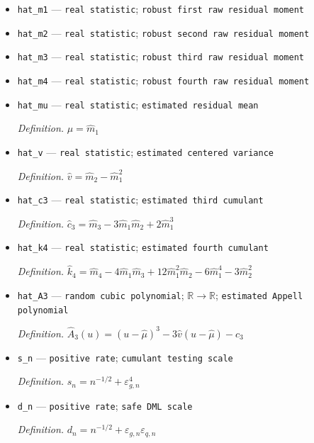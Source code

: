 \documentclass{article}
\begin{document}
\begin{itemize}
  \item \texttt{hat\_\allowbreak{}m1} --- \texttt{real statistic}; \texttt{robust first raw residual moment}
  \item \texttt{hat\_\allowbreak{}m2} --- \texttt{real statistic}; \texttt{robust second raw residual moment}
  \item \texttt{hat\_\allowbreak{}m3} --- \texttt{real statistic}; \texttt{robust third raw residual moment}
  \item \texttt{hat\_\allowbreak{}m4} --- \texttt{real statistic}; \texttt{robust fourth raw residual moment}
  \item \texttt{hat\_\allowbreak{}mu} --- \texttt{real statistic}; \texttt{estimated residual mean}
  \par\smallskip\noindent\emph{Definition.} \(\widehat\mu=\widehat m_1\)
  \item \texttt{hat\_\allowbreak{}v} --- \texttt{real statistic}; \texttt{estimated centered variance}
  \par\smallskip\noindent\emph{Definition.} \(\widehat v=\widehat m_2-\widehat m_1^2\)
  \item \texttt{hat\_\allowbreak{}c3} --- \texttt{real statistic}; \texttt{estimated third cumulant}
  \par\smallskip\noindent\emph{Definition.} \(\widehat c_3=\widehat m_3-3\widehat m_1\widehat m_2+2\widehat m_1^3\)
  \item \texttt{hat\_\allowbreak{}k4} --- \texttt{real statistic}; \texttt{estimated fourth cumulant}
  \par\smallskip\noindent\emph{Definition.} \(\widehat k_4=\widehat m_4-4\widehat m_1\widehat m_3+12\widehat m_1^2\widehat m_2-6\widehat m_1^4-3\widehat m_2^2\)
  \item \texttt{hat\_\allowbreak{}A3} --- \texttt{random cubic polynomial}; \(\mathbb R\to\mathbb R\); \texttt{estimated Appell polynomial}
  \par\smallskip\noindent\emph{Definition.} \(\widehat A_3(u)=(u-\widehat\mu)^3-3\widehat v(u-\widehat\mu)-\widehat c_3\)
  \item \texttt{s\_\allowbreak{}n} --- \texttt{positive rate}; \texttt{cumulant testing scale}
  \par\smallskip\noindent\emph{Definition.} \(s_n=n^{-1/2}+\varepsilon_{g,n}^4\)
  \item \texttt{d\_\allowbreak{}n} --- \texttt{positive rate}; \texttt{safe DML scale}
  \par\smallskip\noindent\emph{Definition.} \(d_n=n^{-1/2}+\varepsilon_{g,n}\varepsilon_{q,n}\)

\end{itemize}
\end{document}
